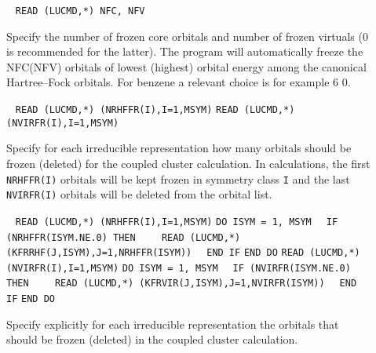 \begin{description}
\item[] \verb| |\newline
      \verb|READ (LUCMD,*) NFC, NFV|

     Specify the number of frozen core orbitals and number of frozen virtuals (0 is recommended for the latter).
     The program will automatically freeze the NFC(NFV) orbitals of lowest (highest) orbital energy
     among the canonical Hartree--Fock orbitals.
     For benzene a relevant choice is for example 6 0.

\item[] \verb| |\newline
      \verb|READ (LUCMD,*) (NRHFFR(I),I=1,MSYM)|\newline
      \verb|READ (LUCMD,*) (NVIRFR(I),I=1,MSYM)|

      Specify for each irreducible representation how
      many orbitals should be frozen (deleted) for the coupled
      cluster calculation. In calculations, the first \verb+NRHFFR(I)+
      orbitals will be kept frozen in symmetry class \verb+I+ and
      the last \verb+NVIRFR(I)+ orbitals will be deleted from the 
      orbital list.
 
\item[]  \verb| |\newline
    \verb|READ (LUCMD,*) (NRHFFR(I),I=1,MSYM)|\newline
    \verb|DO ISYM = 1, MSYM|\newline
    \verb|  IF (NRHFFR(ISYM.NE.0) THEN|\newline
    \verb|    READ (LUCMD,*) (KFRRHF(J,ISYM),J=1,NRHFFR(ISYM))|\newline
    \verb|  END IF|\newline
    \verb|END DO|\newline
    \verb|READ (LUCMD,*) (NVIRFR(I),I=1,MSYM)|\newline
    \verb|DO ISYM = 1, MSYM|\newline
    \verb|  IF (NVIRFR(ISYM.NE.0) THEN|\newline
    \verb|    READ (LUCMD,*) (KFRVIR(J,ISYM),J=1,NVIRFR(ISYM))|\newline
    \verb|  END IF|\newline
    \verb|END DO|

    Specify explicitly for each irreducible representation the
    orbitals that should be frozen (deleted) in the coupled cluster
    calculation.
 

\end{description}
